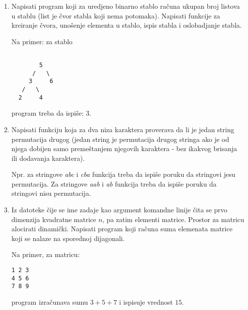 \begin{enumerate}
\item Napisati program koji za uredjeno binarno stablo ra\v cuna ukupan broj
listova u stablu (list je \v cvor stabla koji nema potomaka).
Napisati funkcije za kreiranje \v cvora,
uno\v senje elementa u stablo, ispis stabla i oslobadjanje stabla.

Na primer: za stablo

\begin{verbatim}

        5
      /   \
     3     6
   /   \
  2     4

\end{verbatim}

program treba da ispi\v se: $3$.

\item
Napisati funkciju koja za dva niza karaktera proverava da li je
jedan string permutacija drugog (jedan string je permutacija drugog stringa ako
je od njega dobijen samo preme\v stanjem njegovih karaktera - bez ikakvog brisanja
ili dodavanja karaktera).

Npr. za stringove \emph{abc} i \emph{cba} funkcija treba da ispi\v se poruku
da stringovi jesu permutacija. Za stringove \emph{aab} i \emph{ab} funkcija treba
da ispi\v se poruku da stringovi nisu permutacija.

\item
Iz datoteke \v cije se ime zadaje kao argument komandne linije
\v cita se prvo dimenzija kvadratne matrice $n$, pa zatim elementi
matrice. Prostor za matricu alocirati dinami\v cki. Napisati program
koji ra\v cuna suma elemenata matrice koji se nalaze na sporednoj dijagonali.

Na primer, za matricu:
\begin{verbatim}
1 2 3
4 5 6
7 8 9
\end{verbatim}

program izra\v cunava sumu $3+5+7$ i ispisuje vrednost $15$.
\end{enumerate}

